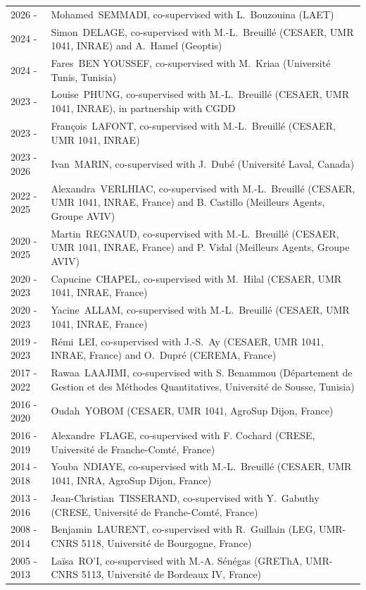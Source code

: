 \documentclass[a4paper,12pt]{article}
\begin{document}
\noindent \begin{longtable}{@{}p{\annee}p{\texte}@{}}
2026 -		& Mohamed~SEMMADI, co-supervised with L.~Bouzouina (LAET) \\
2024 -		& Simon~DELAGE, co-supervised with  M.-L.~Breuillé (CESAER, UMR 1041, INRAE) and A.~Hamel (Geoptis) \\
2024 -		& Fares~BEN YOUSSEF, co-supervised with  M.~Kriaa (Université Tunis, Tunisia) \\
2023 -		& Louise~PHUNG, co-supervised with M.-L.~Breuillé (CESAER, UMR 1041, INRAE), in partnership with CGDD \\
2023 -		& François~LAFONT, co-supervised with M.-L.~Breuillé (CESAER, UMR 1041, INRAE) \\
2023 - 2026	& Ivan~MARIN, co-supervised with J.~Dubé (Université Laval, Canada) \\
2022 - 2025	& Alexandra~VERLHIAC, co-supervised with M.-L.~Breuillé (CESAER, UMR 1041, INRAE, France) and B. Castillo (Meilleurs Agents, Groupe AVIV) \\
2020 - 2025 & Martin~REGNAUD, co-supervised with M.-L.~Breuillé (CESAER, UMR 1041, INRAE, France) and P. Vidal (Meilleurs Agents, Groupe AVIV) \\
2020 - 2023 & Capucine~CHAPEL, co-supervised with M.~Hilal (CESAER, UMR 1041, INRAE, France) \\
2020 - 2023 & Yacine~ALLAM, co-supervised with M.-L.~Breuillé (CESAER, UMR 1041, INRAE, France) \\
2019 - 2023 & Rémi~LEI, co-supervised with J.-S.~Ay (CESAER, UMR 1041, INRAE, France) and O.~Dupré (CEREMA, France) \\
2017 - 2022 & Rawaa~LAAJIMI, co-supervised with S. Benammou (Département de Gestion et des Méthodes Quantitatives, Université de Sousse, Tunisia) \\
2016 - 2020 & Oudah~YOBOM (CESAER, UMR 1041, AgroSup Dijon, France) \\
2016 - 2019 & Alexandre~FLAGE, co-supervised with F. Cochard (CRESE, Université de Franche-Comté, France) \\
2014 - 2018 & Youba~NDIAYE, co-supervised with M.-L.~Breuillé (CESAER, UMR 1041, INRA, AgroSup Dijon, France) \\
2013 - 2016 & Jean-Christian~TISSERAND, co-supervised with Y.~Gabuthy (CRESE, Université de Franche-Comté, France) \\
2008 - 2014 & Benjamin~LAURENT, co-supervised with R.~Guillain (LEG, UMR-CNRS 5118, Université de Bourgogne, France) \\
2005 - 2013 & Laïsa~RO'I, co-supervised with M.-A. Sénégas (GREThA, UMR-CNRS 5113, Université de Bordeaux IV, France)
\end{longtable}
\end{document}
